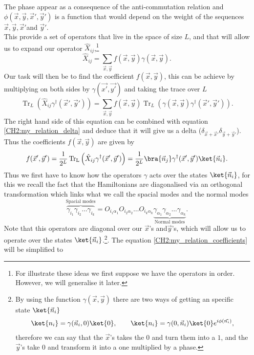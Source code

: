 The phase appear as a consequence of the anti-commutation relation and $\phi(\vec{x},\vec{y},\vec{x}',\vec{y}')$ is a function that would depend on the weight of the sequences $\vec{x},\vec{y},\vec{x}'$and $\vec{y}'$.\\
This provide a set of operators that live in the space of size $L$, and that will allow us to expand our operator $\hat{X}_{ij}$,\footnote{For illustrate these ideas we first suppose we have the operators in order. However, we will generalise it later.}
\begin{equation}
\hat{X}_{ij} = \sum_{\vec{x},\vec{y}} f(\vec{x},\vec{y})\gamma(\vec{x},\vec{y}).
\end{equation}
Our task will then be to find the coefficient $f(\vec{x},\vec{y})$, this can be achieve by multiplying on both sides by $\gamma(\vec{x'},\vec{y'})$ and taking the trace over $L$
\begin{equation}
\operatorname{Tr}_L\left(\hat{X}_{ij}\gamma^{\dagger}(\vec{x}',\vec{y}')\right)=\sum_{\vec{x},\vec{y}}f(\vec{x},\vec{y}) \operatorname{Tr}_L\left(\gamma(\vec{x},\vec{y})\gamma^{\dagger}(\vec{x}',\vec{y}')\right).
\end{equation}
The right hand side of this equation can be combined with equation \eqref{CH2:my_relation_delta} and deduce that it will give us a delta ($\delta_{\vec{x}+\vec{x}'}\delta_{\vec{y}+\vec{y}'}$). Thus the coefficients $f(\vec{x},\vec{y})$ are given by
\begin{equation}
f(\vec{x}',\vec{y}') = \frac{1}{2^L}\operatorname{Tr_L}\left(\hat{X}_{ij}\gamma^{\dagger}(\vec{x}',\vec{y}')\right)=\frac{1}{2^L} \bra{\vec{n}_j}\gamma^{\dagger}(\vec{x}',\vec{y}')\ket{\vec{n}_i}.
\label{CH2:my_relation_coefficients}
\end{equation}
Thus we first have to know how the operators $\gamma$ acts over the states $\ket{\vec{n}_i}$, for this we recall the fact that the Hamiltonians are diagonalised via an orthogonal transformation which links what we call the spacial modes and the normal modes
\begin{equation}
\overbrace{\gamma_{i_1}\gamma_{i_2}\ldots\gamma_{i_k}}^{\text{Spacial modes}}= O_{i_1\alpha_1}O_{i_2\alpha_2}\ldots O_{i_k\alpha_k} \underbrace{\gamma_{\alpha_1}\gamma_{\alpha_2}\ldots\gamma_{\alpha_k}}_{\text{Normal modes}}.
\end{equation}
Note that this operators are diagonal over our $\vec{x}$'s and$\vec{y}$'s, which will allow us to operate over the states $\ket{\vec{n}_i}$.\footnote{By using the function $\gamma(\vec{x},\vec{y})$ there are two ways of getting an specific state $\ket{\vec{n}_i}$
\begin{equation}
\ket{n_i}=\gamma(\vec{n}_i,0)\ket{0}, \qquad \ket{n_i}=\gamma(0,\vec{n}_i)\ket{0}e^{i\phi(\vec{n_i})},
\end{equation}
therefore we can say that the $\vec{x}$'s takes the $0$ and turn them into a $1$, and the $\vec{y}$'s take $0$ and transform it into a one multiplied by a phase.
}. The equation \eqref{CH2:my_relation_coefficients} will be simplified to
